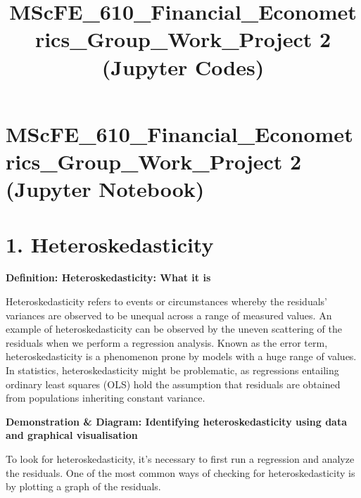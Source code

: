 \documentclass[11pt]{article}
\title{MScFE\_610\_Financial\_Econometrics\_Group\_Work\_Project 2 (Jupyter Codes)}
\begin{document}
    
    \maketitle
    
    

    
    \hypertarget{mscfe_610_financial_econometrics_group_work_project-2-jupyter-notebook}{%
\section{\texorpdfstring{\textbf{MScFE\_610\_Financial\_Econometrics\_Group\_Work\_Project
2 (Jupyter
Notebook)}}{MScFE\_610\_Financial\_Econometrics\_Group\_Work\_Project 2 (Jupyter Notebook)}}\label{mscfe_610_financial_econometrics_group_work_project-2-jupyter-notebook}}

    \hypertarget{heteroskedasticity}{%
\section{\texorpdfstring{\textbf{1.
Heteroskedasticity}}{1. Heteroskedasticity}}\label{heteroskedasticity}}

    \textbf{Definition: Heteroskedasticity: What it is}

    Heteroskedasticity refers to events or circumstances whereby the
residuals' variances are observed to be unequal across a range of
measured values. An example of heteroskedasticity can be observed by the
uneven scattering of the residuals when we perform a regression
analysis. Known as the error term, heteroskedasticity is a phenomenon
prone by models with a huge range of values. In statistics,
heteroskedasticity might be problematic, as regressions entailing
ordinary least squares (OLS) hold the assumption that residuals are
obtained from populations inheriting constant variance.

    \textbf{Demonstration \& Diagram: Identifying heteroskedasticity using
data and graphical visualisation}

    To look for heteroskedasticity, it's necessary to first run a regression
and analyze the residuals. One of the most common ways of checking for
heteroskedasticity is by plotting a graph of the residuals.
\end{document}
